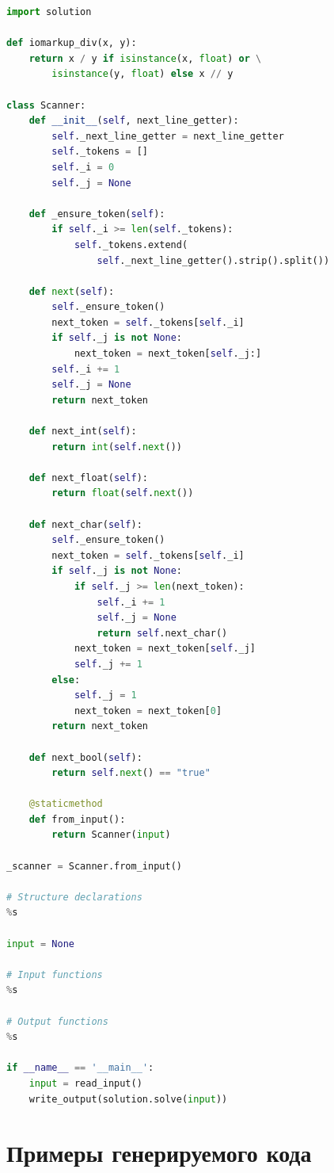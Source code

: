 \documentclass[times,specification,annotation]{style/itmo-student-thesis/itmo-student-thesis}
\begin{document}
\begin{lstlisting}[caption={Шаблон исходного кода грейдера на языке Python},label={templates-grader-python},language=Python]
import solution

def iomarkup_div(x, y):
    return x / y if isinstance(x, float) or \
        isinstance(y, float) else x // y

class Scanner:
    def __init__(self, next_line_getter):
        self._next_line_getter = next_line_getter
        self._tokens = []
        self._i = 0
        self._j = None

    def _ensure_token(self):
        if self._i >= len(self._tokens):
            self._tokens.extend(
                self._next_line_getter().strip().split())

    def next(self):
        self._ensure_token()
        next_token = self._tokens[self._i]
        if self._j is not None:
            next_token = next_token[self._j:]
        self._i += 1
        self._j = None
        return next_token

    def next_int(self):
        return int(self.next())

    def next_float(self):
        return float(self.next())

    def next_char(self):
        self._ensure_token()
        next_token = self._tokens[self._i]
        if self._j is not None:
            if self._j >= len(next_token):
                self._i += 1
                self._j = None
                return self.next_char()
            next_token = next_token[self._j]
            self._j += 1
        else:
            self._j = 1
            next_token = next_token[0]
        return next_token

    def next_bool(self):
        return self.next() == "true"

    @staticmethod
    def from_input():
        return Scanner(input)

_scanner = Scanner.from_input()

# Structure declarations
%s

input = None

# Input functions
%s

# Output functions
%s

if __name__ == '__main__':
    input = read_input()
    write_output(solution.solve(input))
\end{lstlisting}

\chapter{Примеры генерируемого кода}
\end{document}
